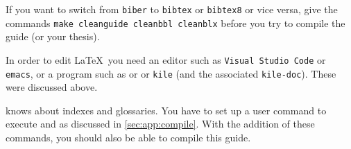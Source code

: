 If you want to switch from \texttt{biber} to
\texttt{bibtex} or \texttt{bibtex8} or vice versa, give the commands
\texttt{make cleanguide cleanbbl cleanblx} before you try to compile
the guide (or your thesis).

In order to edit \LaTeX\ you need an editor such as
\texttt{Visual Studio Code} or \texttt{emacs}, or
a program such as \TeXstudio or \TeXmaker or
\texttt{kile} (and the associated \texttt{kile-doc}).
These were discussed above.

\TeXstudio knows about indexes and glossaries. You have to set up a
user command to execute  and 
as discussed in \cref{sec:app:compile}. With the addition of
these commands, you should also be able to compile this guide.
